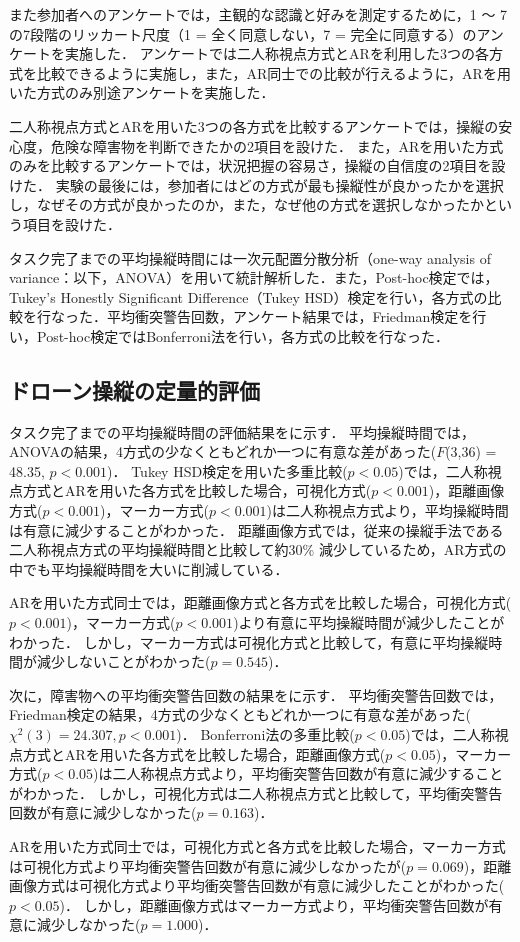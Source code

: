 \documentclass[submit, sigrecommended]{ipsj}
\begin{document}

\par
また参加者へのアンケートでは，主観的な認識と好みを測定するために，1 〜 7 の7段階のリッカート尺度（1 = 全く同意しない，7 = 完全に同意する）のアンケートを実施した．
アンケートでは二人称視点方式とARを利用した3つの各方式を比較できるように実施し，また，AR同士での比較が行えるように，ARを用いた方式のみ別途アンケートを実施した．
\par
二人称視点方式とARを用いた3つの各方式を比較するアンケートでは，操縦の安心度，危険な障害物を判断できたかの2項目を設けた．
また，ARを用いた方式のみを比較するアンケートでは，状況把握の容易さ，操縦の自信度の2項目を設けた．
実験の最後には，参加者にはどの方式が最も操縦性が良かったかを選択し，なぜその方式が良かったのか，また，なぜ他の方式を選択しなかったかという項目を設けた．
\par
タスク完了までの平均操縦時間には一次元配置分散分析（one-way analysis of variance：以下，ANOVA）を用いて統計解析した．また，Post-hoc検定では，Tukey’s Honestly Significant Difference（Tukey HSD）検定を行い，各方式の比較を行なった．平均衝突警告回数，アンケート結果では，Friedman検定を行い，Post-hoc検定ではBonferroni法を行い，各方式の比較を行なった．
    
\subsection{ドローン操縦の定量的評価}
\label{result_1}
タスク完了までの平均操縦時間の評価結果をに示す．
平均操縦時間では，ANOVAの結果，4方式の少なくともどれか一つに有意な差があった($F$(3,36) = 48.35, $p < 0.001 $)．
Tukey HSD検定を用いた多重比較($p < 0.05$)では，二人称視点方式とARを用いた各方式を比較した場合，可視化方式($p < 0.001$)，距離画像方式($p < 0.001$)，マーカー方式($p < 0.001$)は二人称視点方式より，平均操縦時間は有意に減少することがわかった．
距離画像方式では，従来の操縦手法である二人称視点方式の平均操縦時間と比較して約30\% 減少しているため，AR方式の中でも平均操縦時間を大いに削減している．
\par
ARを用いた方式同士では，距離画像方式と各方式を比較した場合，可視化方式($p < 0.001$)，マーカー方式($p < 0.001$)より有意に平均操縦時間が減少したことがわかった．
しかし，マーカー方式は可視化方式と比較して，有意に平均操縦時間が減少しないことがわかった($p = 0.545$)．
\par
次に，障害物への平均衝突警告回数の結果をに示す．
平均衝突警告回数では，Friedman検定の結果，4方式の少なくともどれか一つに有意な差があった($\chi^{2}(3)=24.307, p < 0.001$)．
Bonferroni法の多重比較($p < 0.05$)では，二人称視点方式とARを用いた各方式を比較した場合，距離画像方式($p < 0.05$)，マーカー方式($p < 0.05$)は二人称視点方式より，平均衝突警告回数が有意に減少することがわかった．
しかし，可視化方式は二人称視点方式と比較して，平均衝突警告回数が有意に減少しなかった($p = 0.163$)．
\par
ARを用いた方式同士では，可視化方式と各方式を比較した場合，マーカー方式は可視化方式より平均衝突警告回数が有意に減少しなかったが($p = 0.069$)，距離画像方式は可視化方式より平均衝突警告回数が有意に減少したことがわかった($p < 0.05$)．
しかし，距離画像方式はマーカー方式より，平均衝突警告回数が有意に減少しなかった($p = 1.000$)．
\end{document}
